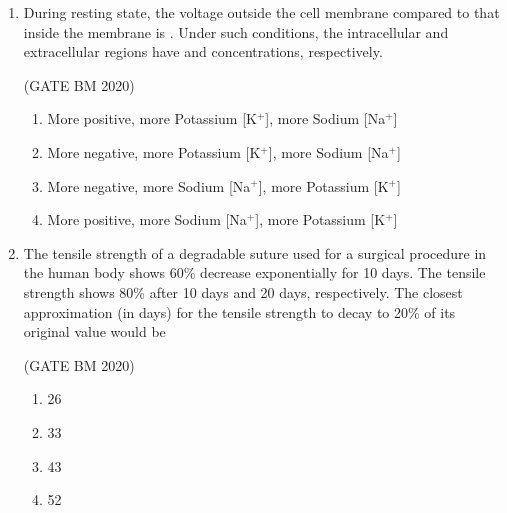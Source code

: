 \documentclass[journal]{IEEEtran}
\begin{document}
\begin{enumerate}
\hfill(GATE BM 2020)

\begin{multicols}{2}
\begin{enumerate}
  \item 0.14
  \item 1.40
  \item 8.43
  \item 34.7
\end{enumerate}
\end{multicols}


\item During resting state, the voltage outside the cell membrane compared to that inside the membrane is \underline{\hspace{1.5cm}}. Under such conditions, the intracellular and extracellular regions have \underline{\hspace{1.5cm}} and \underline{\hspace{1.5cm}} concentrations, respectively.



	\hfill(GATE BM 2020)
\begin{enumerate}
  \item More positive, more Potassium [K$^+$], more Sodium [Na$^+$]
  \item More negative, more Potassium [K$^+$], more Sodium [Na$^+$]
  \item More negative, more Sodium [Na$^+$], more Potassium [K$^+$]
  \item More positive, more Sodium [Na$^+$], more Potassium [K$^+$]
\end{enumerate}

\item The tensile strength of a degradable suture used for a surgical procedure in the human body shows 60\% decrease exponentially for 10 days. The tensile strength shows 80\% after 10 days and 20 days, respectively. The closest approximation (in days) for the tensile strength to decay to 20\% of its original value would be



	\hfill(GATE BM 2020)
\begin{multicols}{4}
\begin{enumerate}
  \item 26
  \item 33
  \item 43
  \item 52
\end{enumerate}
\end{multicols}



\end{enumerate}
\end{document}
